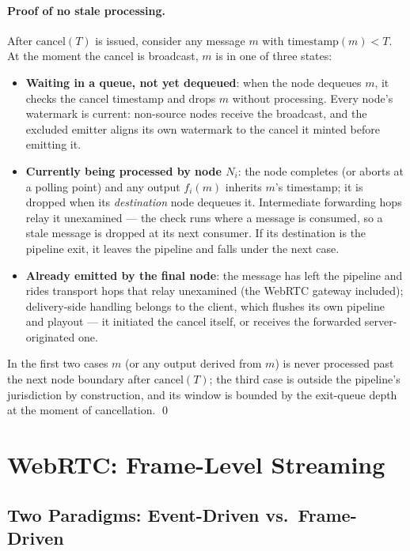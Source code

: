 \documentclass[11pt,a4paper]{article}
\begin{document}
\paragraph{Proof of no stale processing.}
After $\text{cancel}(T)$ is issued, consider any message $m$ with $\text{timestamp}(m) < T$. At the moment the cancel is broadcast, $m$ is in one of three states:
\begin{itemize}[nosep]
    \item \textbf{Waiting in a queue, not yet dequeued}: when the node dequeues $m$, it checks the cancel timestamp and drops $m$ without processing. Every node's watermark is current: non-source nodes receive the broadcast, and the excluded emitter aligns its own watermark to the cancel it minted before emitting it.
    \item \textbf{Currently being processed by node $N_i$}: the node completes (or aborts at a polling point) and any output $f_i(m)$ inherits $m$'s timestamp; it is dropped when its \emph{destination} node dequeues it. Intermediate forwarding hops relay it unexamined --- the check runs where a message is consumed, so a stale message is dropped at its next consumer. If its destination is the pipeline exit, it leaves the pipeline and falls under the next case.
    \item \textbf{Already emitted by the final node}: the message has left the pipeline and rides transport hops that relay unexamined (the WebRTC gateway included); delivery-side handling belongs to the client, which flushes its own pipeline and playout --- it initiated the cancel itself, or receives the forwarded server-originated one.
\end{itemize}
In the first two cases $m$ (or any output derived from $m$) is never processed past the next node boundary after $\text{cancel}(T)$; the third case is outside the pipeline's jurisdiction by construction, and its window is bounded by the exit-queue depth at the moment of cancellation. \qed

\section{WebRTC: Frame-Level Streaming}
\label{sec:webrtc}

\subsection{Two Paradigms: Event-Driven vs.\ Frame-Driven}
\label{sec:paradigms}
\end{document}
